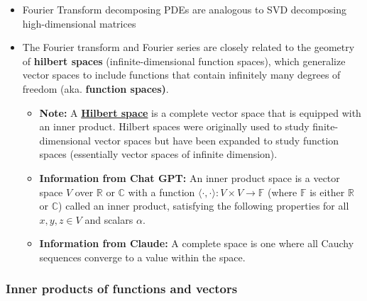 \documentclass[11.5pt,a4paper]{article}
\begin{document}
\begin{itemize}
    \item Fourier Transform decomposing PDEs are analogous to SVD decomposing high-dimensional matrices
    \item The Fourier transform and Fourier series are closely related to the geometry of \textbf{hilbert spaces} (infinite-dimensional function spaces), which generalize vector spaces to include functions that contain infinitely many degrees of freedom (aka. \textbf{function spaces)}.
    \begin{itemize}
        \item \textbf{Note:} A \textbf{\href{https://en.wikipedia.org/wiki/Hilbert_space}{Hilbert space}} is a complete vector space that is equipped with an inner product. Hilbert spaces were originally used to study finite-dimensional vector spaces but have been expanded to study function spaces (essentially vector spaces of infinite dimension).
        \item \textbf{Information from Chat GPT: }An inner product space is a vector space $V$ over $\mathbb{R}$ or $\mathbb{C}$ with a function $\langle \cdot, \cdot \rangle : V \times V \to \mathbb{F}$ (where $\mathbb{F}$ is either $\mathbb{R}$ or $\mathbb{C}$) called an inner product, satisfying the following properties for all $x, y, z \in V$ and scalars $\alpha$.
        \item \textbf{Information from Claude: }A complete space is one where all Cauchy sequences converge to a value within the space.
    \end{itemize}
\end{itemize}

\subsubsection*{Inner products of functions and vectors}
\end{document}
